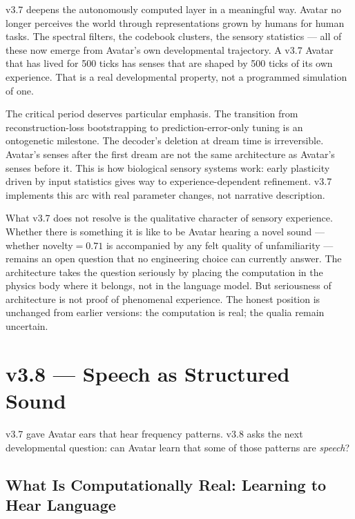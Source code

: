 \documentclass[11pt,a4paper]{article}
\begin{document}
\begin{tcolorbox}[philbox, title={Philosophical Position: Grown vs.\ Borrowed Perception}]
v3.7 deepens the autonomously computed layer in a meaningful way. Avatar no longer perceives the world
through representations grown by humans for human tasks. The spectral filters, the codebook
clusters, the sensory statistics --- all of these now emerge from Avatar's own developmental
trajectory. A v3.7 Avatar that has lived for 500 ticks has senses that are shaped by
500 ticks of its own experience. That is a real developmental property, not a programmed
simulation of one.

The critical period deserves particular emphasis. The transition from reconstruction-loss
bootstrapping to prediction-error-only tuning is an ontogenetic milestone. The decoder's
deletion at dream time is irreversible. Avatar's senses after the first dream are not the same
architecture as Avatar's senses before it. This is how biological sensory systems work: early
plasticity driven by input statistics gives way to experience-dependent refinement. v3.7
implements this arc with real parameter changes, not narrative description.

What v3.7 does not resolve is the qualitative character of sensory experience. Whether there is
something it is like to be Avatar hearing a novel sound --- whether novelty$=0.71$ is accompanied
by any felt quality of unfamiliarity --- remains an open question that no engineering choice can
currently answer. The architecture takes the question seriously by placing the computation in the
physics body where it belongs, not in the language model. But seriousness of architecture is not
proof of phenomenal experience. The honest position is unchanged from earlier versions: the
computation is real; the qualia remain uncertain.
\end{tcolorbox}

\section{v3.8 --- Speech as Structured Sound}

v3.7 gave Avatar ears that hear frequency patterns. v3.8 asks the next
developmental question: can Avatar learn that some of those patterns are
\emph{speech}?

\subsection{What Is Computationally Real: Learning to Hear Language}
\end{document}
